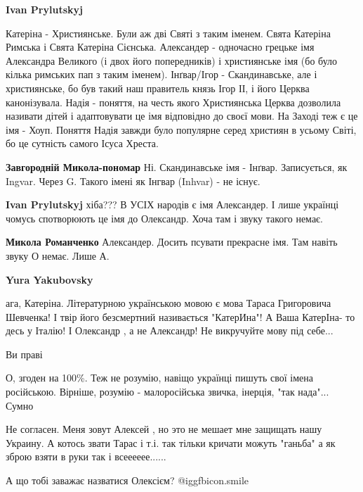 \begin{itemize}
\begin{itemize}
\textbf{Ivan Prylutskyj} 

Катеріна - Християнське. Були аж дві Святі з таким іменем. Свята Катеріна
Римська і Свята Катеріна Сієнська. Александер - одночасно грецьке імя
Александра Великого (і двох його попередників) і християнське імя (бо було
кілька римських пап з таким іменем). Інґвар/Ігор - Скандинавське, але і
християнське, бо був такий наш правитель князь Ігор ІІ, і його Церква
канонізувала. Надія - поняття, на честь якого Християнська Церква дозволила
називати дітей і адаптовувати це імя відповідно до своєї мови. На Заході теж є
це імя - Хоуп. Поняття Надія завжди було популярне серед християн в усьому
Світі, бо це сутність самого Ісуса Хреста.

\textbf{Завгородній Микола-пономар} Ні. Скандинавське імя - Інґвар. Записується, як Ingvar. Через G. Такого імені як Інгвар (Inhvar) - не існує.

\textbf{Ivan Prylutskyj} хіба??? В УСІХ народів є імя Александер. І лише українці чомусь спотворюють це імя до Олександр. Хоча там і звуку такого немає.

\textbf{Микола Романченко} Александер. Досить псувати прекрасне імя. Там навіть звуку О немає. Лише А.

\textbf{Yura Yakubovsky} 

ага, Катеріна. Літературною українською мовою є мова Тараса Григоровича
Шевченка! І твір його безсмертний називається "КатерИна"! А Ваша КатерІна- то
десь у Італію! І Олександр , а не Александр! Не викручуйте мову під себе...

\end{itemize} %

Ви праві


О, згоден на 100\%. Теж не розумію, навіщо українці пишуть свої імена
російською. Вірніше, розумію - малоросійська звичка, інерція, "так нада"...
Сумно


Не согласен. Меня зовут Алексей , но это не мешает мне защищать нашу Украину. А
котось звати Тарас і т.і. так тільки кричати можуть "ганьба" а як зброю взяти в
руки так і всееееее......

\begin{itemize} %
А що тобі заважає назватися Олексієм?  @igg{fbicon.smile} 


\end{itemize}
\end{itemize}

